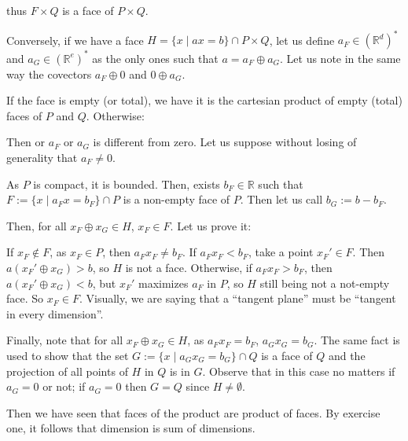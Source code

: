 \documentclass[a4paper,10pt]{article}
\newcommand{\st}{ \; \left| \right. \;}
\newcommand{\R}{\mathbb{R}}
\begin{document}
\begin{enumerate}
    thus $F\times Q$ is a face of $P\times Q$.

    Conversely, if we have a face $H = \{ x \st a x = b\} \cap P\times Q$, let us define $a_F \in (\R^d)^*$ and $a_G\in (\R^e)^*$ as the only ones such that $a = a_F \oplus a_G$. Let us note in the same way the covectors $a_F \oplus 0$ and $ 0 \oplus a_G$.
    
    If the face is empty (or total), we have it is the cartesian product of empty (total) faces of $P$ and $Q$. Otherwise:
    
    Then or $a_F$ or $a_G$ is different from zero. Let us suppose without losing of generality that $a_F\neq0$.
    
    As $P$ is compact, it is bounded. Then, exists $b_F\in\R$ such that $F := \{x \st a_Fx = b_F\}\cap P$ is a non-empty face of $P$. Then let us call $b_G := b - b_F$.
    
    Then, for all $x_F\oplus x_G\in H$, $x_F \in F$. Let us prove it:
    
    If $x_F \notin F$, as $x_F\in P$, then $a_F x_F \neq b_F$. If $a_F x_F < b_F$, take a point $x_F'\in F$. Then $a (x_F' \oplus x_G) > b$, so $H$ is not a face. Otherwise, if $a_F x_F > b_F$, then $a (x_F' \oplus x_G) < b$, but $x_F'$ maximizes $a_F$ in $P$, so $H$ still being not a not-empty face. So $x_F \in F$. Visually, we are saying that a ``tangent plane'' must be ``tangent in every dimension''.
    
    Finally, note that for all $x_F\oplus x_G\in H$, as $a_F x_F = b_F$, $a_G x_G = b_G$. The same fact is used to show that the set $G:=\{x \st a_G x_G = b_G\}\cap Q$ is a face of $Q$ and the projection of all points of $H$ in $Q$ is in $G$. Observe that in this case no matters if $a_G = 0$ or not; if $a_G = 0$ then $G = Q$ since $H\neq \emptyset$.
    
    Then we have seen that faces of the product are product of faces. By exercise one, it follows that dimension is sum of dimensions.
    
    
    
  \end{enumerate}
\end{document}
